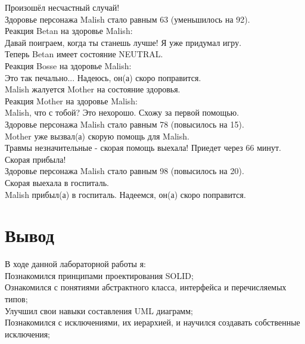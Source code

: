 \noindent Произошёл несчастный случай! \\
Здоровье персонажа Malish стало равным 63 (уменьшилось на 92). \\
Реакция Betan на здоровье Malish: \\
Давай поиграем, когда ты станешь лучше! Я уже придумал игру. \\
Теперь Betan имеет состояние NEUTRAL. \\
Реакция Bosse на здоровье Malish: \\
Это так печально... Надеюсь, он(а) скоро поправится. \\
Malish жалуется Mother на состояние здоровья. \\
Реакция Mother на здоровье Malish: \\
Malish, что с тобой? Это нехорошо. Схожу за первой помощью. \\
Здоровье персонажа Malish стало равным 78 (повысилось на 15). \\
Mother уже вызвал(а) скорую помощь для Malish. \\
Травмы незначительные - скорая помощь выехала! Приедет через 66 минут. \\
Скорая прибыла! \\
Здоровье персонажа Malish стало равным 98 (повысилось на 20). \\
Скорая выехала в госпиталь. \\
Malish прибыл(а) в госпиталь. Надеемся, он(а) скоро поправится. \\

\section{Вывод}
В ходе данной лабораторной работы я: \\
Познакомился принципами проектирования SOLID; \\
Ознакомился с понятиями абстрактного класса, интерфейса и перечисляемых типов; \\
Улучшил свои навыки составления UML диаграмм; \\
Познакомился с исключениями, их иерархией, и научился создавать собственные исключения;

